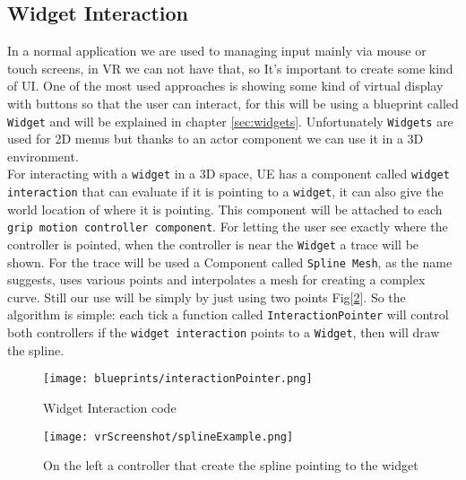 \subsection{Widget Interaction}
\label{chp:widgetInteraction}
\noindent 
In a normal application we are used to managing input mainly via mouse or touch screens, in \ac{VR} we can not have that, so It's important to create some kind of \ac{UI}.
One of the most used approaches is showing some kind of virtual display with buttons so that the user can interact, for this will be using a blueprint called \texttt{Widget} and will be explained in chapter \ref{sec:widgets}.
Unfortunately \texttt{Widgets} are used for 2D menus but thanks to an actor component we can use it in a 3D environment.\\
For interacting with a \texttt{widget} in a 3D space, \ac{UE} has a component called \texttt{widget interaction} that can evaluate if it is pointing to a \texttt{widget}, it can also give the world location of where it is pointing. This component will be attached to each \texttt{grip motion controller component}.
For letting the user see exactly where the controller is pointed, when the controller is near the \texttt{Widget} a trace will be shown.
For the trace will be used a Component called \texttt{Spline Mesh}, as the name suggests, uses various points and interpolates a mesh for creating a complex curve.
Still our use will be simply by just using two points Fig[\ref{fig:splineExample}]. So the algorithm is simple: each tick a function called \texttt{InteractionPointer} will control both controllers if the \texttt{widget interaction} points to a \texttt{Widget}, then will draw the spline.



\begin{figure}[h]
    \centering
    \texttt{[image: blueprints/interactionPointer.png]}
    \caption{Widget Interaction code}
    \label{fig:InteractionPointer}
\end{figure}

\begin{figure}[h]
    \centering
    \texttt{[image: vrScreenshot/splineExample.png]}
    \caption{On the left a controller that create the spline pointing to the widget}
    \label{fig:splineExample}
\end{figure}

